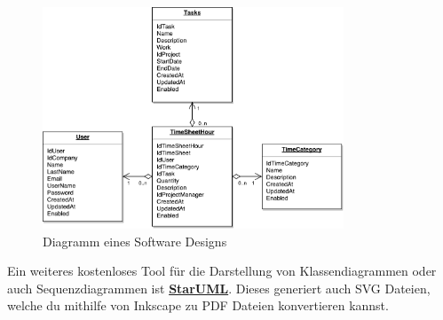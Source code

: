 \begin{figure}[ht]
	\centering
	\includegraphics[width=0.8\textwidth]{images/Diagramm.pdf} 
	\caption{Diagramm eines Software Designs}
	\label{fig:Diagramm-DrawIo}
\end{figure}

Ein weiteres kostenloses Tool für die Darstellung von Klassendiagrammen oder auch Sequenzdiagrammen ist \textbf{\href{http://staruml.io/}{StarUML}}. Dieses generiert auch SVG Dateien, welche du mithilfe von Inkscape zu PDF Dateien konvertieren kannst.
